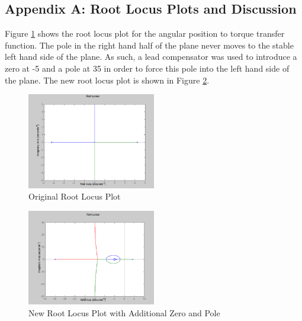 \documentclass[11pt]{report}
\begin{document}
\begin{spacing}{1.5}
\clearpage

\section*{Appendix A: Root Locus Plots and Discussion}

Figure \ref{RootLocusOriginal} shows the root locus plot for the angular position to torque transfer function.  The pole in the right hand half of the plane never moves to the stable left hand side of the plane.  As such, a lead compensator was used to introduce a zero at -5 and a pole at 35 in order to force this pole into the left hand side of the plane.  The new root locus plot is shown in Figure \ref{RootLocusNew}.

\begin{figure}[H]
                \centering
                \includegraphics[width=0.5\textwidth]{RootLocusOriginal}
                \caption{Original Root Locus Plot}
                \label{RootLocusOriginal}
            \end{figure}

\begin{figure}[H]
                \centering
                \includegraphics[width=0.5\textwidth]{RootLocusNew}
                \caption{New Root Locus Plot with Additional Zero and Pole}
                \label{RootLocusNew}
            \end{figure}


\end{spacing}
\end{document}
